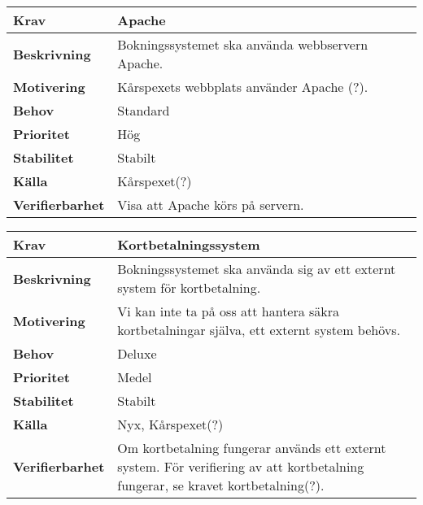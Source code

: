 \documentclass[a4paper, twoside, 11pt, titlepage]{article}
\begin{document}
		\begin{tabular} { p{2.6cm} p{12.5cm} }
			\hline
			\sffamily\textbf{Krav} & Apache  \\
			\hline
			\sffamily\textbf{Beskrivning} & Bokningssystemet ska använda webbservern Apache.  \\
			\hline
			\sffamily\textbf{Motivering} & Kårspexets webbplats använder Apache (?).  \\
			\hline
			\sffamily\textbf{Behov} & Standard  \\
			\hline
			\sffamily\textbf{Prioritet} & Hög  \\
			\hline
			\sffamily\textbf{Stabilitet} & Stabilt  \\
			\hline
			\sffamily\textbf{Källa} & Kårspexet(?)  \\
			\hline
			\sffamily\textbf{Verifierbarhet} & Visa att Apache körs på servern.  \\
			\hline
		\end{tabular}
		\vspace{6mm}

		\begin{tabular} { p{2.6cm} p{12.5cm} }
			\hline
			\sffamily\textbf{Krav} & Kortbetalningssystem  \\
			\hline
			\sffamily\textbf{Beskrivning} & Bokningssystemet ska använda sig av ett externt system för kortbetalning.  \\
			\hline
			\sffamily\textbf{Motivering} & Vi kan inte ta på oss att hantera säkra kortbetalningar själva, ett externt system behövs.  \\
			\hline
			\sffamily\textbf{Behov} & Deluxe  \\
			\hline
			\sffamily\textbf{Prioritet} & Medel  \\
			\hline
			\sffamily\textbf{Stabilitet} & Stabilt  \\
			\hline
			\sffamily\textbf{Källa} & Nyx, Kårspexet(?)  \\
			\hline
			\sffamily\textbf{Verifierbarhet} & Om kortbetalning fungerar används ett externt system. För verifiering av att kortbetalning fungerar, se kravet kortbetalning(?).  \\
			\hline
		\end{tabular}
\end{document}
